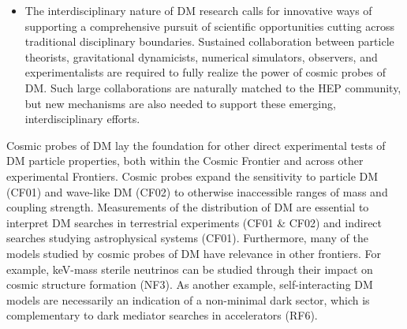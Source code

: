 \documentclass[nofootinbib]{article}
\begin{document}
\begin{itemize}[nosep]
\item The interdisciplinary nature of DM research calls for innovative ways of supporting a comprehensive pursuit of scientific opportunities cutting across traditional disciplinary boundaries. Sustained collaboration between particle theorists, gravitational dynamicists, numerical simulators, observers, and experimentalists are required to fully realize the power of cosmic probes of DM. Such large collaborations are naturally matched to the HEP community, but new mechanisms are also needed to support these emerging, interdisciplinary efforts. 


\end{itemize}



\vspace{1em}

\noindent Cosmic probes of DM lay the foundation for other direct experimental tests of DM particle properties, both within the Cosmic Frontier and across other experimental Frontiers. 
Cosmic probes expand the sensitivity to particle DM (CF01) and wave-like DM (CF02) to otherwise inaccessible ranges of mass and coupling strength.
Measurements of the distribution of DM are essential to interpret DM searches in terrestrial experiments (CF01 \& CF02) and indirect searches studying astrophysical systems (CF01).
Furthermore, many of the models studied by cosmic probes of DM have relevance in other frontiers.
For example, keV-mass sterile neutrinos  can be studied through their impact on cosmic structure formation (NF3).
As another example, self-interacting DM models are necessarily an indication of a non-minimal dark sector, which is complementary to dark mediator searches in accelerators (RF6).
\end{document}
